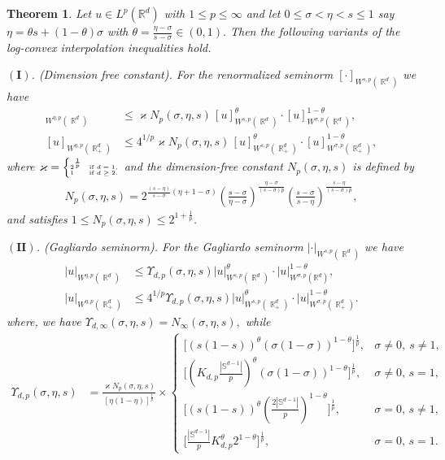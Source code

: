 \documentclass[12pt, reqno]{amsart}%
\theoremstyle{plain}  %
\newtheorem{theorem}{Theorem}[section]
\theoremstyle{definition}  %
\theoremstyle{remark}
\numberwithin{equation}{section}
\DeclareMathOperator{\R}{\mathbb{R}}
\begin{document}
\begin{theorem}%
\label{thm:robust-interpo-esti}
Let $u\in L^p(\mathbb{R}^d)$ with $1\leq p\leq \infty$ and let $0\leq \sigma<\eta<s\leq 1$ say $\eta=\theta s+(1-\theta)\sigma$ with $
\theta=\frac{\eta-\sigma}{s-\sigma}\in(0,1).$
Then the following variants of the log-convex interpolation inequalities hold.
\medskip

\noindent
$\mathbf{(I)}$. (Dimension free constant).  For the renormalized seminorm $[\cdot]_{W^{s,p}(\R^d)}$ we have
\begin{align*}
[u]_{W^{\eta,p}(\R^d)}
&\leq
\varkappa N_p(\sigma,\eta,s)
\,[u]_{W^{s,p}(\R^d)}^{\theta}
\cdot [u]_{W^{\sigma,p}(\R^d)}^{1-\theta},\\
[u]_{W^{\eta,p}(\R^d_+)}
&\leq
4^{1/p}\varkappa N_p(\sigma,\eta,s)
\,[u]_{W^{s,p}(\R^d_+)}^{\theta}
\cdot [u]_{W^{\sigma,p}(\R^d_+)}^{1-\theta},
\end{align*}
where $\tiny{\varkappa = \begin{cases} 2^{\frac{1}{p}} & \text{if } d = 1, \\[-2pt]
 1 & \text{if } d \geq 2. \end{cases}}$ and the dimension-free constant $N_p(\sigma,\eta,s)$ is defined by
\begin{align*}
N_p(\sigma,\eta,s)
= 2^{\frac{(s-\eta)}{s-\sigma}(\eta+1-\sigma)}
\left(\frac{s-\sigma}{\eta-\sigma}\right)^{\frac{\eta-\sigma}{(s-\sigma)p}}
\left(\frac{s-\sigma}{s-\eta}\right)^{\frac{s-\eta}{(s-\sigma)p}},
\end{align*}
and satisfies $1\leq N_p(\sigma,\eta,s)\leq  2^{1+\frac{1}{p}}$.
\medskip

$\mathbf{(II)}$. (Gagliardo seminorm).
For the Gagliardo  seminorm $|\cdot|_{W^{s,p}(\R^d)}$ we have
\begin{align*}
|u|_{W^{\eta,p}(\R^d)}
&\leq
\Upsilon_{d,p}(\sigma,\eta,s)
|u|_{W^{s,p}(\R^d)}^\theta\cdot
|u|_{W^{\sigma,p}(\mathbb{R}^d)}^{1-\theta},\\
|u|_{W^{\eta,p}(\R^d_+)}
&\leq
4^{1/p}\Upsilon_{d,p}(\sigma,\eta,s)
|u|_{W^{s,p}(\R^d_+)}^\theta\cdot
|u|_{W^{\sigma,p}(\R^d_+)}^{1-\theta}.
\end{align*}
where, we have   $\Upsilon_{d,\infty}(\sigma,\eta,s)=N_\infty(\sigma,\eta,s),$ while
\begin{align*}
\Upsilon_{d,p}(\sigma,\eta,s)
&=
\frac{\varkappa N_p(\sigma,\eta,s)}{[\eta(1-\eta)]^{\frac{1}{p}}}
\times
\begin{cases}
\big[(s(1-s))^\theta(\sigma(1-\sigma))^{1-\theta}\big]^{\frac{1}{p}},
& \sigma\neq0,\ s\neq1,
\\
\big[(K_{d,p}\tfrac{|\mathbb{S}^{d-1}|}{p})^\theta
(\sigma(1-\sigma))^{1-\theta}\big]^{\frac{1}{p}},
& \sigma\neq0,\, s=1,
\\
\big[(s(1-s))^\theta(\tfrac{ 2|\mathbb{S}^{d-1}|}{p})^{1-\theta}\big]^{\frac{1}{p}},
& \sigma=0, \, s\neq1,
\\
\big[\tfrac{|\mathbb{S}^{d-1}|}{p}K_{d,p}^\theta2^{1-\theta}\big]^{\frac{1}{p}},
& \sigma=0,\, s=1.
\end{cases}
\end{align*}


\end{theorem}
\end{document}

